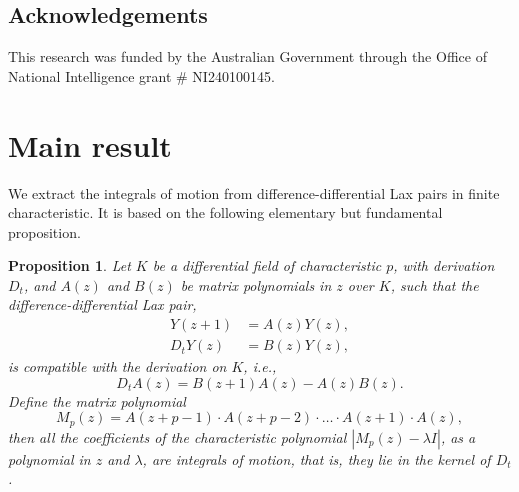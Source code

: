 \documentclass[a4paper,reqno]{amsart}
\numberwithin{equation}{section}
\newtheorem{proposition}[theorem]{Proposition}
\numberwithin{figure}{section}
\theoremstyle{remark}
\begin{document}
\subsection{Acknowledgements}
This research was funded by the Australian Government through the Office of National Intelligence grant \# NI240100145. 










\section{Main result}\label{sect:main res}
We extract the integrals of motion from difference-differential Lax pairs in finite characteristic. It is based on the following elementary but fundamental proposition.
\begin{proposition}\label{prop: charc inv}
Let $K$ be a differential field of characteristic $p$, with derivation $D_t$, and $A(z)$ and $B(z)$ be matrix polynomials in $z$ over $K$, such that the difference-differential Lax pair,
\begin{align*}
Y(z+1)&=A(z)Y(z), \\
    D_t Y(z)&=B(z)Y(z),
\end{align*}
is compatible with the derivation on $K$, i.e.,
\begin{equation}\label{eq:coefdif}
    D_t A(z)=B(z+1)A(z)-A(z)B(z).
\end{equation}
Define the matrix polynomial
\begin{equation}\label{eq:Mp def}
    M_p(z)=A(z+p-1)\cdot A(z+p-2)\cdot\ldots\cdot A(z+1)\cdot A(z),
\end{equation}
then all the coefficients of the characteristic polynomial $|M_p(z)-\lambda I|$, as a polynomial in $z$ and $\lambda$, are integrals of motion, that is, they lie in the kernel of $D_t$.
\end{proposition}
\end{document}
